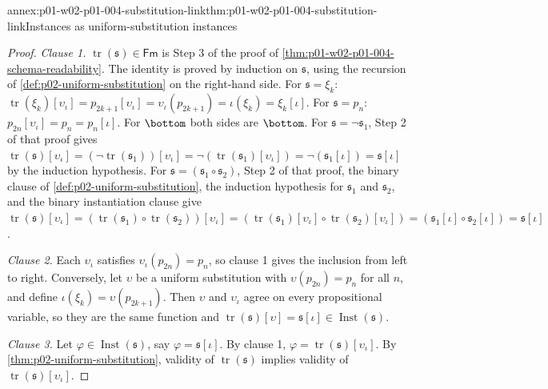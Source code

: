 \begin{annexitem}{annex:p01-w02-p01-004-substitution-link}{thm:p01-w02-p01-004-substitution-link}{Instances as uniform-substitution instances}
\begin{proof}
\emph{Clause 1.} \(\operatorname{tr}(\mathfrak s)\in\mathsf{Fm}\) is Step 3 of
the proof of \cref{thm:p01-w02-p01-004-schema-readability}. The identity is
proved by induction on \(\mathfrak s\), using the recursion of
\cref{def:p02-uniform-substitution} on the right-hand side. For
\(\mathfrak s=\xi_k\):
\(\operatorname{tr}(\xi_k)[\upsilon_\iota]=p_{2k+1}[\upsilon_\iota]
=\upsilon_\iota(p_{2k+1})=\iota(\xi_k)=\xi_k[\iota]\). For
\(\mathfrak s=p_n\):
\(p_{2n}[\upsilon_\iota]=p_n=p_n[\iota]\). For \(\bottom\) both sides are
\(\bottom\). For \(\mathfrak s=\neg\mathfrak s_1\), Step 2 of that proof gives
\(\operatorname{tr}(\mathfrak s)[\upsilon_\iota]
=(\neg\operatorname{tr}(\mathfrak s_1))[\upsilon_\iota]
=\neg(\operatorname{tr}(\mathfrak s_1)[\upsilon_\iota])
=\neg(\mathfrak s_1[\iota])=\mathfrak s[\iota]\) by the induction hypothesis.
For \(\mathfrak s=(\mathfrak s_1\circ\mathfrak s_2)\), Step 2 of that
proof, the binary clause of \cref{def:p02-uniform-substitution}, the induction
hypothesis for \(\mathfrak s_1\) and \(\mathfrak s_2\), and the binary
instantiation clause give
\(\operatorname{tr}(\mathfrak s)[\upsilon_\iota]
=(\operatorname{tr}(\mathfrak s_1)\circ\operatorname{tr}(\mathfrak
s_2))[\upsilon_\iota]
=(\operatorname{tr}(\mathfrak s_1)[\upsilon_\iota]\circ
\operatorname{tr}(\mathfrak s_2)[\upsilon_\iota])
=(\mathfrak s_1[\iota]\circ\mathfrak s_2[\iota])
=\mathfrak s[\iota]\).

\emph{Clause 2.} Each \(\upsilon_\iota\) satisfies
\(\upsilon_\iota(p_{2n})=p_n\), so clause 1 gives the inclusion from left to
right. Conversely, let \(\upsilon\) be a uniform substitution with
\(\upsilon(p_{2n})=p_n\) for all \(n\), and define \(\iota(\xi_k)=
\upsilon(p_{2k+1})\). Then \(\upsilon\) and \(\upsilon_\iota\) agree on every
propositional variable, so they are the same function and
\(\operatorname{tr}(\mathfrak s)[\upsilon]=\mathfrak s[\iota]\in
\operatorname{Inst}(\mathfrak s)\).

\emph{Clause 3.} Let \(\varphi\in\operatorname{Inst}(\mathfrak s)\), say
\(\varphi=\mathfrak s[\iota]\). By clause 1,
\(\varphi=\operatorname{tr}(\mathfrak s)[\upsilon_\iota]\). By
\cref{thm:p02-uniform-substitution}, validity of
\(\operatorname{tr}(\mathfrak s)\) implies validity of
\(\operatorname{tr}(\mathfrak s)[\upsilon_\iota]\).
\end{proof}
\end{annexitem}

